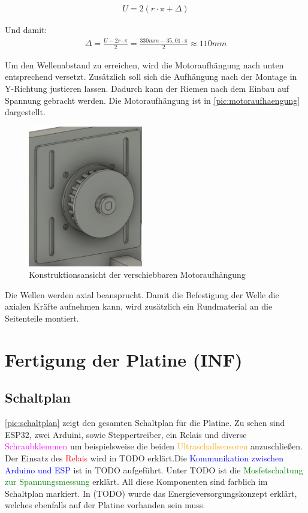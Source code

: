 \begin{align}
	U = 2 (r \cdot \pi+ \Delta) 
\end{align}

Und damit: 
\begin{align}	
	\Delta = \frac{U - 2r \cdot \pi}{2} = \frac{330mm - 35,01 \cdot \pi}{2} \approx 110mm 
\end{align}

Um den Wellenabstand zu erreichen, wird die Motoraufhängung nach unten entsprechend versetzt. Zusätzlich soll sich die Aufhängung nach der Montage in Y-Richtung justieren lassen. Dadurch kann der Riemen nach dem Einbau auf Spannung gebracht werden. Die Motoraufhängung ist in \autoref{pic:motoraufhaengung} dargestellt. 


\begin{figure}[h]
	\centering
	\includegraphics[width=5cm]{motoraufhaengung.png}
	\caption{Konstruktionsansicht der verschiebbaren Motoraufhängung}
	\label{pic:motoraufhaengung}
\end{figure}

Die Wellen werden axial beansprucht. Damit die Befestigung der Welle die axialen Kräfte aufnehmen kann, wird zusätzlich ein Rundmaterial an die Seitenteile montiert. 
\newpage

\chapter{Fertigung der Platine (INF)}
\section{Schaltplan}
\label{sec:eCardPlan}
\autoref{pic:schaltplan} zeigt den gesamten Schaltplan für die Platine. Zu sehen sind ESP32, zwei Arduini, sowie Steppertreiber, ein Relais und diverse \textcolor{magenta}{Schraubklemmen} um beispielsweise die beiden \textcolor{orange}{Ultraschallsensoren} anzuschließen. Der Einsatz des \textcolor{red}{Relais} wird in TODO erklärt.Die \textcolor{blue}{Kommunikation zwischen Arduino und ESP} ist in TODO aufgeführt. Unter TODO ist die \textcolor{green}{Mosfetschaltung zur Spannungsmessung} erklärt. All diese Komponenten sind farblich im Schaltplan markiert. In (TODO) wurde das Energieversorgungskonzept erklärt, welches ebenfalls auf der Platine vorhanden sein muss.

